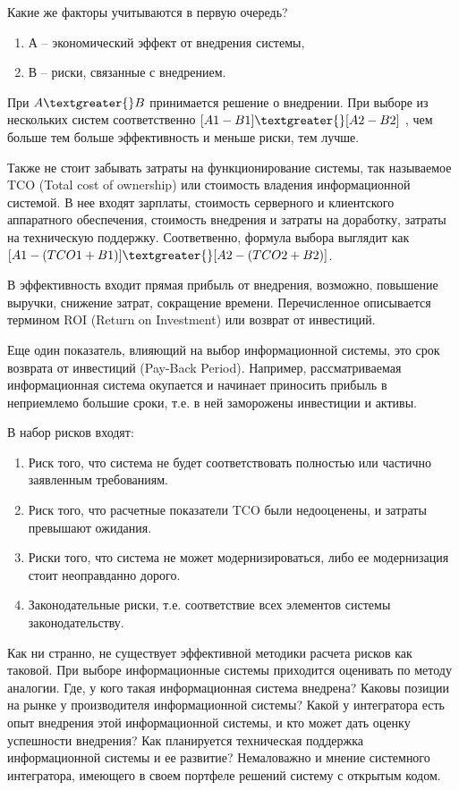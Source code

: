 \documentclass[10pt, a5paper]{article}
\begin{document}
Какие же факторы учитываются в первую очередь?

\begin{enumerate}
  \item А -- экономический эффект от внедрения системы,
  \item В – риски, связанные с внедрением.
\end{enumerate}

При $A \textgreater{} B$  принимается решение о внедрении. При выборе из нескольких систем соответственно $[A1-B1]\textgreater{}[A2-B2]$ , чем больше тем больше эффективность и меньше риски, тем лучше.

Также не стоит забывать затраты на функционирование системы, так называемое TCO (Total cost of ownership) или стоимость владения информационной системой. В нее входят зарплаты, стоимость серверного и клиентского аппаратного обеспечения, стоимость внедрения и затраты на доработку, затраты на техническую поддержку.
Соответвенно, формула выбора выглядит как $[A1 - (TCO1 + B1)] \textgreater{} [A2-(TCO2 + B2)]$.

В эффективность входит прямая прибыль от внедрения, возможно, повышение выручки, снижение затрат, сокращение времени.
Перечисленное описывается термином ROI (Return on \linebreak Investment) или возврат от инвестиций.

Еще один показатель, влияющий на выбор информационной системы, это срок возврата от инвестиций (Pay-Back Period). Например, рассматриваемая информационная система окупается и начинает приносить прибыль в неприемлемо большие сроки, т.е. в ней заморожены инвестиции и активы.

В набор рисков входят:

\begin{enumerate}
  \item Риск того, что система не будет соответствовать полностью или частично заявленным требованиям.
  \item Риск того, что расчетные показатели TCO были недооценены, и затраты превышают ожидания.
  \item Риски того, что система не может модернизироваться, либо ее модернизация стоит неоправданно дорого.
  \item Законодательные риски, т.е. соответствие всех элементов системы законодательству.
\end{enumerate}

Как ни странно, не существует эффективной методики расчета рисков как таковой. При выборе информационные системы приходится оценивать по методу аналогии. Где, у кого такая информационная система внедрена? Каковы позиции на рынке у производителя информационной системы? Какой у интегратора есть опыт внедрения этой информационной системы, и кто может дать оценку успешности внедрения? Как планируется техническая поддержка информационной системы и ее развитие?
Немаловажно и мнение системного интегратора, имеющего в своем портфеле решений систему с открытым кодом.
\end{document}
